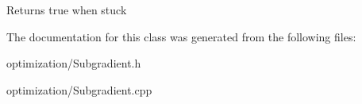 \begin{DoxyReturn}{Returns}
true when stuck 
\end{DoxyReturn}


The documentation for this class was generated from the following files:\begin{DoxyCompactItemize}
\item 
optimization/Subgradient.h\item 
optimization/Subgradient.cpp\end{DoxyCompactItemize}
